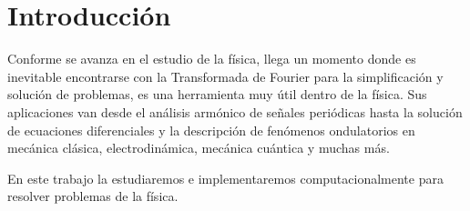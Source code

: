 \section{Introducción}
\label{sec:intro}

Conforme se avanza en el estudio de la física, llega un momento donde es inevitable encontrarse con la Transformada de
Fourier para la simplificación y solución de problemas, es una herramienta muy útil dentro de la física.
Sus aplicaciones van desde el análisis armónico de señales periódicas hasta la solución de ecuaciones diferenciales
y la descripción de fenómenos ondulatorios en mecánica clásica, electrodinámica, mecánica cuántica y muchas más.

En este trabajo la estudiaremos e implementaremos computacionalmente para resolver problemas de la física.